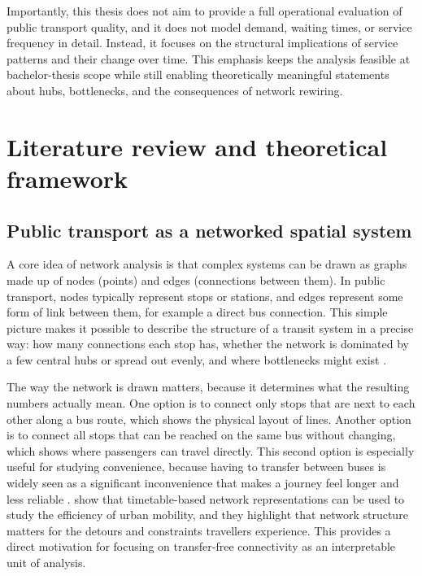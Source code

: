 \documentclass[12pt,a4paper,oneside]{report}
\begin{document}
Importantly, this thesis does not aim to provide a full operational evaluation of public transport quality, and it does not model demand, waiting times, or service frequency in detail.
Instead, it focuses on the structural implications of service patterns and their change over time.
This emphasis keeps the analysis feasible at bachelor-thesis scope while still enabling theoretically meaningful statements about hubs, bottlenecks, and the consequences of network rewiring.

\chapter{Literature review and theoretical framework}\label{ch:literature}

\section{Public transport as a networked spatial system}\label{sec:network-system}

A core idea of network analysis is that complex systems can be drawn as graphs made up of nodes (points) and edges (connections between them).
In public transport, nodes typically represent stops or stations, and edges represent some form of link between them, for example a direct bus connection.
This simple picture makes it possible to describe the structure of a transit system in a precise way: how many connections each stop has, whether the network is dominated by a few central hubs or spread out evenly, and where bottlenecks might exist \citep{barthelemy2011}.

The way the network is drawn matters, because it determines what the resulting numbers actually mean.
One option is to connect only stops that are next to each other along a bus route, which shows the physical layout of lines.
Another option is to connect all stops that can be reached on the same bus without changing, which shows where passengers can travel directly.
This second option is especially useful for studying convenience, because having to transfer between buses is widely seen as a significant inconvenience that makes a journey feel longer and less reliable \citep{iseki2009}.
\citet{gallotti2014} show that timetable-based network representations can be used to study the efficiency of urban mobility, and they highlight that network structure matters for the detours and constraints travellers experience.
This provides a direct motivation for focusing on transfer-free connectivity as an interpretable unit of analysis.
\end{document}

